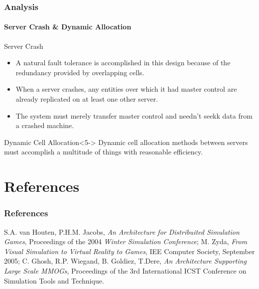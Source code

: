 \begin{frame}[fragile]
\frametitle{Analysis}
\framesubtitle{Server Crash \& Dynamic Allocation}
\begin{block}{Server Crash}
\begin{itemize}
\item <2->
A natural fault tolerance is accomplished in this design because
of the redundancy provided by overlapping cells.
\item <3->
When a server crashes, any entities over which it had master control are
already replicated on at least one other server.
\item <4->
The system must merely transfer master control and needn't seekk data from a
crashed machine.
\end{itemize}
\end{block}
\begin{block}{Dynamic Cell Allocation}<5->
Dynamic cell allocation methods between servers must
accomplish a multitude of things with reasonable efficiency.
\end{block}
\end{frame}

\section*{References}
\begin{frame}
\frametitle{References}
\begin{thebibliography}{}
 S.A. van Houten, P.H.M. Jacobs, \emph{An Architecture for
Distribuited Simulation Games},
Proceedings of the 2004 \emph{Winter Simulation Conference};
 M. Zyda, \emph{From Visual Simulation to Virtual Reality to
Games}, IEE Computer Society, September 2005;
 C. Ghosh, R.P. Wiegand, B. Goldiez, T.Dere, \emph{An
Architecture Supporting Large Scale MMOGs},
Proceedings of the 3rd International ICST Conference on Simulation Tools
and Technique.
\end{thebibliography}
\end{frame}
